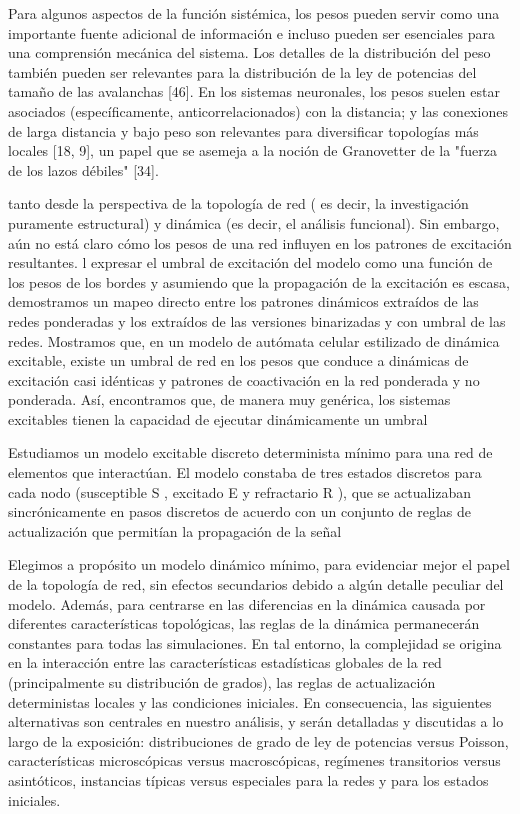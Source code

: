 Para algunos aspectos de la función sistémica, los pesos pueden servir como una importante fuente adicional de información e incluso pueden ser esenciales para una comprensión mecánica del sistema. Los detalles de la distribución del peso también pueden ser relevantes para la distribución de la ley de potencias del tamaño de las avalanchas [46]. En los sistemas neuronales, los pesos suelen estar asociados (específicamente, anticorrelacionados) con la distancia; y las conexiones de larga distancia y bajo peso son relevantes para diversificar topologías más locales [18, 9], un papel que se asemeja a la noción de Granovetter de la "fuerza de los lazos débiles" [34].


tanto desde la perspectiva de la topología de red ( es decir, la investigación puramente estructural) y dinámica (es decir, el análisis funcional). Sin embargo, aún no está claro cómo los pesos de una red influyen en los patrones de excitación resultantes. l expresar el umbral de excitación del modelo como una función de los pesos de los bordes y asumiendo que la propagación de la excitación es escasa, demostramos un mapeo directo entre los patrones dinámicos extraídos de las redes ponderadas y los extraídos de las versiones binarizadas y con umbral de las redes. Mostramos que, en un modelo de autómata celular estilizado de dinámica excitable, existe un umbral de red en los pesos que conduce a dinámicas de excitación casi idénticas y patrones de coactivación en la red ponderada y no ponderada. Así, encontramos que, de manera muy genérica, los sistemas excitables tienen la capacidad de ejecutar dinámicamente un umbral

Estudiamos un modelo excitable discreto determinista mínimo para una red de elementos que interactúan. El modelo constaba de tres estados discretos para cada nodo (susceptible S , excitado E y refractario R ), que se actualizaban sincrónicamente en pasos discretos de acuerdo con un conjunto de reglas de actualización que permitían la propagación de la señal



Elegimos a propósito un modelo dinámico mínimo, para evidenciar mejor el papel de la topología de red, sin efectos secundarios debido a algún detalle peculiar del modelo. Además, para centrarse en las diferencias en la dinámica causada por diferentes características topológicas, las reglas de la dinámica permanecerán constantes para todas las simulaciones. En tal entorno, la complejidad se origina en la interacción entre las características estadísticas globales de la red (principalmente su distribución de grados), las reglas de actualización deterministas locales y las condiciones iniciales. En consecuencia, las siguientes alternativas son centrales en nuestro análisis, y serán detalladas y discutidas a lo largo de la exposición: distribuciones de grado de ley de potencias versus Poisson, características microscópicas versus macroscópicas, regímenes transitorios versus asintóticos, instancias típicas versus especiales para la redes y para los estados iniciales.

